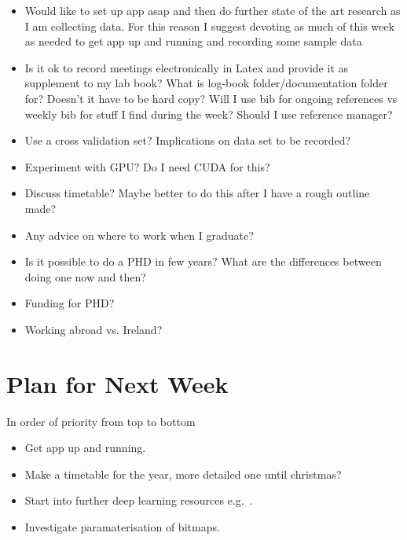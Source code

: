 \documentclass[]{weekly-report}
\begin{document}
\begin{itemize}

\item Would like to set up app asap and then do further state of the art research as I am collecting data. For this reason I suggest devoting as much of this week as needed to get app up and running and recording some sample data 

\item Is it ok to record meetings electronically in Latex and provide it as supplement to my lab book? What is log-book folder/documentation folder for? Doesn't it have to be hard copy? Will I use bib for ongoing references vs weekly bib for stuff I find during the week? Should I use reference manager?

\item Use a cross validation set? Implications on data set to be recorded?

\item Experiment with GPU? Do I need CUDA for this?

\item Discuss timetable? Maybe better to do this after I have a rough outline made?

\item Any advice on where to work when I graduate?

\item Is it possible to do a PHD in few years? What are the differences between doing one now and then?

\item Funding for PHD?

\item Working abroad vs. Ireland?

\end{itemize}

\section{Plan for Next Week}
In order of priority from top to bottom

\begin{itemize}
\item Get app up and running.

\item Make a timetable for the year, more detailed one until christmas?

\item Start into further deep learning resources e.g.~\cite{Ng-Coursera-2016, VincentVanhoucke-Udacity-2016, Nvidia-DL-Course-2016}.

\item Investigate paramaterisation of bitmaps.

\end{itemize}
\end{document}
